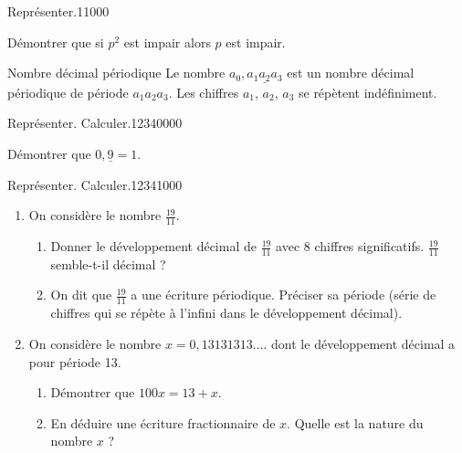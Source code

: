 \begin{pageParcourst}


\begin{ExoCtN}{Représenter.}{1}{1}{0}{0}{0}

Démontrer que si $p^2$ est impair alors $p$ est impair.

 
\end{ExoCtN}

\begin{DefT}{Nombre décimal périodique}
Le nombre $a_0,\underline{a_1a_2a_3}$ est un nombre décimal périodique de période $a_1a_2a_3$. Les chiffres $a_1$, $a_2$, $a_3$ se répètent indéfiniment.
\end{DefT}

\begin{ExoCtN}{Représenter. Calculer.}{1234}{0}{0}{0}{0} 
 
Démontrer que $0,\underline{9}=1$.   
 
\end{ExoCtN}

 
\begin{ExoCtN}{Représenter. Calculer.}{1234}{1}{0}{0}{0}

\begin{enumerate}
\item On considère le nombre $\frac{19}{11}$.

\begin{enumerate}
\item Donner le développement décimal de $\frac{19}{11}$ avec 8 chiffres significatifs. $\frac{19}{11}$ semble-t-il décimal ?
\item On dit que $\frac{19}{11}$ a une écriture périodique.
Préciser sa période (série de chiffres qui se répète à l'infini dans le développement décimal).
\end{enumerate}
\item On considère le nombre $x=0,13131313....$ dont le développement décimal a pour période 13.
\begin{enumerate}
\item Démontrer que $100x = 13 + x$. 
\item  En déduire une écriture fractionnaire de $x$. Quelle est la nature du nombre $x$ ?
\end{enumerate}
\end{enumerate} 
 
\end{ExoCtN}


\end{pageParcourst}
